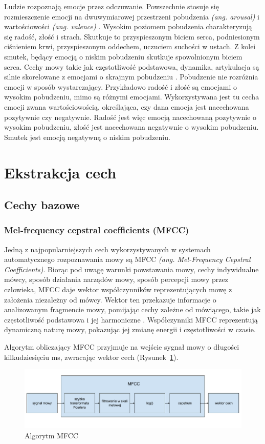 \documentclass[a4paper,12pt,twoside,openany]{report}
\newcommand{\ang}[1]{\textit{(ang. #1)}}
\newcommand{\Rys}[1]{(Rysunek~\ref{#1})}
\begin{document}
Ludzie rozpoznają emocje przez odczuwanie. 
Powszechnie stosuje się rozmieszczenie emocji na dwuwymiarowej przestrzeni pobudzenia \ang{arousal} i wartościowości \ang{valence} \cite{Fernandez2004}.
Wysokim poziomem pobudzenia charakteryzują się radość, złość i strach. 
Skutkuje to przyspieszonym biciem serca, podniesionym ciśnieniem krwi, przyspieszonym oddechem, uczuciem suchości w ustach.
Z kolei smutek, będący emocją o niskim pobudzeniu skutkuje spowolnionym biciem serca.
Cechy mowy takie jak częstotliwość podstawowa, dynamika, artykulacja są silnie skorelowane z emocjami o skrajnym pobudzeniu \cite{Cahn1990}.
Pobudzenie nie rozróżnia emocji w sposób wystarczający. 
Przykładowo radość i złość są emocjami o wysokim pobudzeniu, mimo są różnymi emocjami.
Wykorzystywana jest tu cecha emocji zwana wartościowością, określająca, czy dana emocja jest nacechowana pozytywnie czy negatywnie.
Radość jest więc emocją nacechowaną pozytywnie o wysokim pobudzeniu, złość jest nacechowana negatywnie o wysokim pobudzeniu.
Smutek jest emocją negatywną o niskim pobudzeniu.


\section{Ekstrakcja cech}
\subsection{Cechy bazowe}
\subsubsection{Mel-frequency cepstral coefficients (MFCC)}
Jedną z najpopularniejszych cech wykorzystywanych w systemach automatycznego rozpoznawania mowy są MFCC \ang{Mel-Frequency Cepstral Coefficients}.
Biorąc pod uwagę warunki powstawania mowy, cechy indywidualne mówcy, sposób działania narządów mowy, sposób percepcji mowy przez człowieka,
MFCC daje wektor współczynników reprezentujących mowę z założenia niezależny od mówcy. 
Wektor ten przekazuje informacje o analizowanym fragmencie mowy, pomijając cechy zależne od mówiącego, takie jak częstotliwość podstawowa i jej harmoniczne \cite{Hossan2013}.
Współczynniki MFCC reprezentują dynamiczną naturę mowy, pokazując jej zmianę energii i częstotliwości w czasie.

Algorytm obliczający MFCC przyjmuje na wejście sygnał mowy o długości kilkudziesięciu ms,
zwracając wektor cech \Rys{rys:mgcc:schemat}.
\begin{figure}[h]
	\centering
	\includegraphics[width=\textwidth]{mfcc-schemat}
	\caption{Algorytm MFCC}
	\label{rys:mgcc:schemat}
\end{figure}
\end{document}
